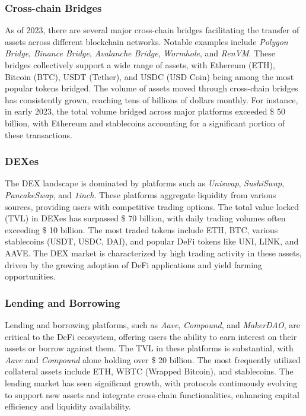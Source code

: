\documentclass[12pt, a4paper]{article}
\begin{document}
\subsubsection{Cross-chain Bridges}

As of 2023, there are several major cross-chain bridges facilitating the transfer of assets across different blockchain networks. Notable examples include \textit{Polygon Bridge}, \textit{Binance Bridge}, \textit{Avalanche Bridge}, \textit{Wormhole}, and \textit{RenVM}. These bridges collectively support a wide range of assets, with Ethereum (ETH), Bitcoin (BTC), USDT (Tether), and USDC (USD Coin) being among the most popular tokens bridged. The volume of assets moved through cross-chain bridges has consistently grown, reaching tens of billions of dollars monthly. For instance, in early 2023, the total volume bridged across major platforms exceeded \$ 50 billion, with Ethereum and stablecoins accounting for a significant portion of these transactions.

\subsubsection{DEXes}

The DEX landscape is dominated by platforms such as \textit{Uniswap}, \textit{SushiSwap}, \textit{PancakeSwap}, and \textit{1inch}. These platforms aggregate liquidity from various sources, providing users with competitive trading options. The total value locked (TVL) in DEXes has surpassed \$ 70 billion, with daily trading volumes often exceeding \$ 10 billion. The most traded tokens include ETH, BTC, various stablecoins (USDT, USDC, DAI), and popular DeFi tokens like UNI, LINK, and AAVE. The DEX market is characterized by high trading activity in these assets, driven by the growing adoption of DeFi applications and yield farming opportunities.

\subsubsection{Lending and Borrowing}

Lending and borrowing platforms, such as \textit{Aave}, \textit{Compound}, and \textit{MakerDAO}, are critical to the DeFi ecosystem, offering users the ability to earn interest on their assets or borrow against them. The TVL in these platforms is substantial, with \textit{Aave} and \textit{Compound} alone holding over \$ 20 billion. The most frequently utilized collateral assets include ETH, WBTC (Wrapped Bitcoin), and stablecoins. The lending market has seen significant growth, with protocols continuously evolving to support new assets and integrate cross-chain functionalities, enhancing capital efficiency and liquidity availability.
\end{document}
